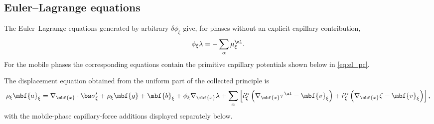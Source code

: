 \subsection{Euler--Lagrange equations}

The Euler--Lagrange equations generated by arbitrary $\delta\phi_\xi$ give,
for phases without an explicit capillary contribution,
\begin{equation}
  \phi_\xi \lambda = - \sum_\alpha \mu^\al_\xi .
  \label{eq:el_lambda}
\end{equation}
For the mobile phases the corresponding equations contain the primitive
capillary potentials shown below in \eqref{eq:el_pc}.

The displacement equation obtained from the uniform part of the collected
principle is
\begin{equation}
    \rho_{\xi}\mbf{a}_{\xi} =
    \nabla_{\mbf{x}}\cdot\bs\sigma'_{\xi} + \rho_{\xi}\mbf{g} + \mbf{b}_{\xi}
    + \phi_{\xi} \nabla_{\mbf{x}}\lambda
    + \sum_\alpha \left[\hat{c}_{\xi}^{\alpha}\left(\nabla_{\mbf{x}}\tau^\al - \mbf{v}_{\xi}\right)
      +\hat r_{\xi}^{\alpha}\left(\nabla_{\mbf{x}}\zeta - \mbf{v}_{\xi}\right)\right],
  \label{eq:el_momentum_uniform}
\end{equation}
with the mobile-phase capillary-force additions displayed separately below.

